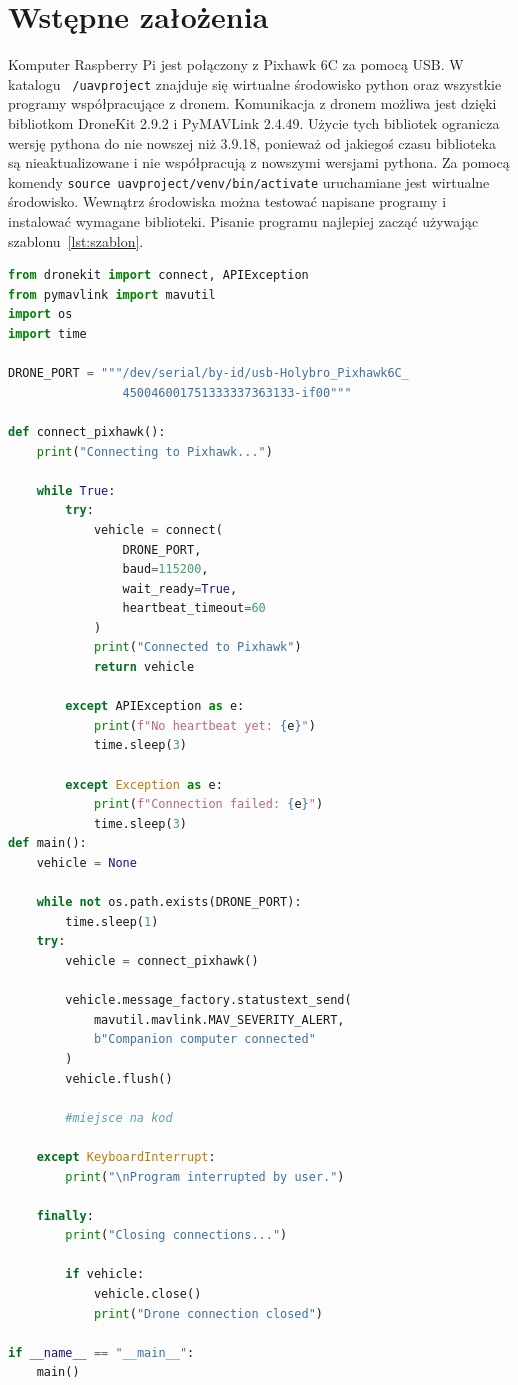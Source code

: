\documentclass[a4paper,12pt]{book}
\begin{document}
    \section{Wstępne założenia}
        Komputer Raspberry Pi jest połączony z Pixhawk 6C za pomocą USB. W katalogu \texttt{\string~/uavproject} znajduje się wirtualne środowisko python oraz wszystkie programy współpracujące z dronem. Komunikacja z dronem możliwa jest dzięki bibliotkom DroneKit 2.9.2 i 
        PyMAVLink 2.4.49.
        Użycie tych bibliotek ogranicza wersję pythona do nie nowszej niż 3.9.18, ponieważ od jakiegoś czasu biblioteka są nieaktualizowane i nie współpracują z nowszymi wersjami pythona. Za pomocą komendy \texttt{source uavproject/venv/bin/activate}
        uruchamiane jest wirtualne środowisko. Wewnątrz środowiska można testować napisane programy i instalować wymagane biblioteki. Pisanie programu najlepiej zacząć używając szablonu~\ref{lst:szablon}.
        \begin{lstlisting}[language=python, caption={Szablon programu działającego na komputerze asystującym}, label={lst:szablon}]
from dronekit import connect, APIException
from pymavlink import mavutil
import os
import time

DRONE_PORT = """/dev/serial/by-id/usb-Holybro_Pixhawk6C_
                450046001751333337363133-if00"""

def connect_pixhawk():
    print("Connecting to Pixhawk...")

    while True:
        try:
            vehicle = connect(
                DRONE_PORT,
                baud=115200,
                wait_ready=True,
                heartbeat_timeout=60
            )
            print("Connected to Pixhawk")
            return vehicle

        except APIException as e:
            print(f"No heartbeat yet: {e}")
            time.sleep(3)

        except Exception as e:
            print(f"Connection failed: {e}")
            time.sleep(3)
def main():
    vehicle = None

    while not os.path.exists(DRONE_PORT):
        time.sleep(1)
    try:
        vehicle = connect_pixhawk()

        vehicle.message_factory.statustext_send(
            mavutil.mavlink.MAV_SEVERITY_ALERT,
            b"Companion computer connected"
        )
        vehicle.flush()

        #miejsce na kod

    except KeyboardInterrupt:
        print("\nProgram interrupted by user.")

    finally:
        print("Closing connections...")

        if vehicle:
            vehicle.close()
            print("Drone connection closed")

if __name__ == "__main__":
    main()
        \end{lstlisting}
\end{document}
